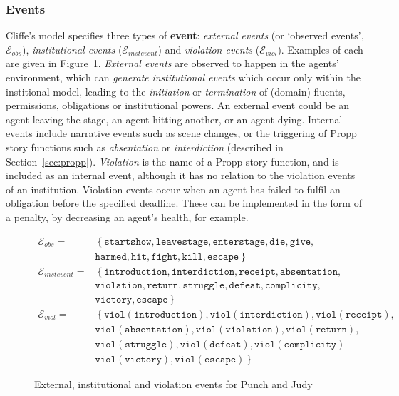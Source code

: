 \documentclass[11pt]{report}
\begin{document}
\subsubsection{Events}
\label{sec:inst-events}
Cliffe's model specifies three types of \textbf{event}: \emph{external events} (or `observed events', $\mathcal{E}_{obs}$), \emph{institutional events} ($\mathcal{E}_{instevent}$) and \emph{violation events} ($\mathcal{E}_{viol}$). Examples of each are given in Figure~\ref{fig:events}.
\emph{External events} are observed to happen in the agents' environment, which can \emph{generate} \emph{institutional events} which occur only within the institional model, leading to the \emph{initiation} or \emph{termination} of (domain) fluents, permissions, obligations or institutional powers.
An external event could be an agent leaving the stage, an agent hitting another, or an agent dying. Internal events include narrative events such as scene changes, or the triggering of Propp story functions such as \emph{absentation} or \emph{interdiction} (described in Section~\ref{sec:propp}). \emph{Violation} is the name of a Propp story function, and is included as an internal event, although it has no relation to the violation events of an institution.
Violation events occur when an agent has failed to fulfil an obligation before the specified deadline. These can be implemented in the form of a penalty, by decreasing an agent's health, for example.

\begin{figure}[!t]
\begin{align}
  \mathcal{E}_{obs} =& \left\{\mathtt{startshow, leavestage, enterstage, die, give,}\right.\nonumber\\
  &\left. {} \mathtt{harmed, hit, fight, kill, escape}\right\}\label{eq:eobs}\\
  \mathcal{E}_{instevent} =& \left\{\mathtt{introduction, interdiction, receipt, absentation,}\right.\nonumber\\
                         &\left. {} \mathtt{violation, return, struggle, defeat, complicity,}\right.\nonumber\\
                         &\left. {} \mathtt{victory, escape}\right\}\label{eq:einst}\\
  \mathcal{E}_{viol} =& \left\{\mathtt{viol(introduction), viol(interdiction), viol(receipt),}\right.\nonumber\\
 &\left. {} \mathtt{viol(absentation), viol(violation), viol(return),}\right.\nonumber\\
 &\left. {} \mathtt{viol(struggle), viol(defeat), viol(complicity)}\right.\nonumber\\
 &\left. {} \mathtt{viol(victory), viol(escape)}\right\}\label{eq:viol}
\end{align}
\caption{External, institutional and violation events for Punch and Judy} \label{fig:events}
\end{figure}
\end{document}
